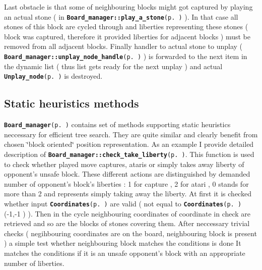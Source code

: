 Last obstacle is that some of neighbouring blocks might got captured by playing an actual stone ( in {\tt {\bf Board\_\-manager::play\_\-a\_\-stone}{\rm (p.\,\pageref{classBoard__manager_a4})}} ). In that case all stones of this block are cycled through and liberties representing these stones ( block was captured, therefore it provided liberties for adjacent blocks ) must be removed from all adjacent blocks. Finally handler to actual stone to unplay ( {\tt {\bf Board\_\-manager::unplay\_\-node\_\-handle}{\rm (p.\,\pageref{classBoard__manager_o6})}} ) is forwarded to the next item in the dynamic list ( thus list gets ready for the next unplay ) and actual {\tt {\bf Unplay\_\-node}{\rm (p.\,\pageref{structUnplay__node})}} is destroyed.\subsection{Static heuristics methods}\label{page_6_page_6__sec_5}
{\tt {\bf Board\_\-manager}{\rm (p.\,\pageref{classBoard__manager})}} contains set of methods supporting static heuristics neccessary for efficient tree search. They are quite similar and clearly benefit from chosen \char`\"{}block oriented\char`\"{} position representation. As an example I provide detailed description of {\tt {\bf Board\_\-manager::check\_\-take\_\-liberty}{\rm (p.\,\pageref{classBoard__manager_a26})}}. This function is used to check whether played move captures, ataris or simply takes away liberty of opponent's unsafe block. These different actions are distinguished by demanded number of opponent's block's liberties : 1 for capture , 2 for atari , 0 stands for more than 2 and represents simply taking away the liberty. At first it is checked whether input {\tt {\bf Coordinates}{\rm (p.\,\pageref{classCoordinates})}} are valid ( not equal to {\tt {\bf Coordinates}{\rm (p.\,\pageref{classCoordinates})}} (-1,-1 ) ). Then in the cycle neighbouring coordinates of coordinate in check are retrieved and so are the blocks of stones covering them. After neccessary trivial checks ( negihbouring coordinates are on the board, neighbouring block is present ) a simple test whether neighbouring block matches the conditions is done It matches the conditions if it is an unsafe opponent's block with an appropriate number of liberties.



